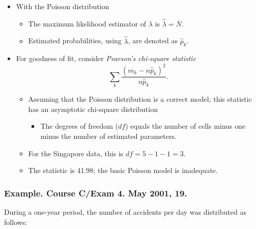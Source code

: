 \documentclass[]{book}
\providecommand{\tightlist}{%
  \setlength{\itemsep}{0pt}\setlength{\parskip}{0pt}}
\begin{document}
\begin{itemize}
\item
  With the Poisson distribution

  \begin{itemize}
  \item
    The maximum likelihood estimator of \(\lambda\) is
    \(\widehat{\lambda}=\overline{N}\).
  \item
    Estimated probabilities, using \(\widehat{\lambda}\), are denoted as
    \(\widehat{p}_k\).
  \end{itemize}
\item
  For goodness of fit, consider \emph{Pearson's chi-square statistic}
  \[\sum_k\frac{\left( m_k-n\widehat{p}_k \right) ^{2}}{n\widehat{p}_k}.\]

  \begin{itemize}
  \item
    Assuming that the Poisson distribution is a correct model; this
    statistic has an asymptotic chi-square distribution

    \begin{itemize}
    \tightlist
    \item
      The degrees of freedom (\(df\)) equals the number of cells minus
      one minus the number of estimated parameters.
    \end{itemize}
  \item
    For the Singapore data, this is \(df=5-1-1=3\).
  \item
    The statistic is 41.98; the basic Poisson model is inadequate.
  \end{itemize}
\end{itemize}

\subsubsection{Example. Course C/Exam 4. May 2001,
19.}\label{example.-course-cexam-4.-may-2001-19.}

During a one-year period, the number of accidents per day was
distributed as follows:
\end{document}
